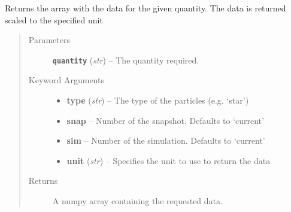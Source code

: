 \documentclass[letterpaper,10pt,english]{sphinxmanual}
\begin{document}
\begin{fulllineitems}
\label{index:facade.get_data}
Returns the array with the data for the given quantity.
The data is returned scaled to the specified unit
\begin{quote}\begin{description}
\item[{Parameters}] \leavevmode
\textbf{\texttt{quantity}} (\emph{str}) -- The quantity required.

\item[{Keyword Arguments}] \leavevmode\begin{itemize}
\item {} 
\textbf{type} (\emph{str}) --
The type of the particles (e.g. `star')

\item {} 
\textbf{snap} --
Number of the snapshot. Defaults to `current'

\item {} 
\textbf{sim} --
Number of the simulation. Defaults to `current'

\item {} 
\textbf{unit} (\emph{str}) --
Specifies the unit to use to return the data

\end{itemize}

\item[{Returns}] \leavevmode
A numpy array containing the requested data.

\end{description}\end{quote}

\end{fulllineitems}

\end{document}
